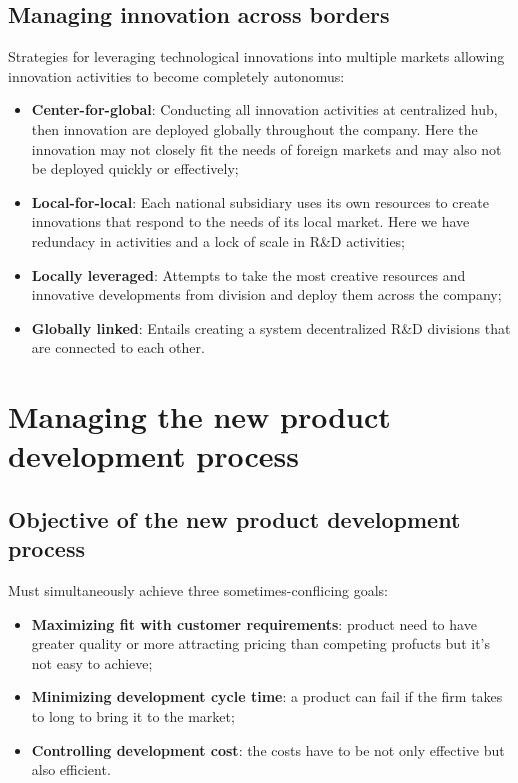\documentclass[12pt]{article}
\begin{document}
\subsection{Managing innovation across borders}
Strategies for leveraging technological innovations into multiple markets allowing innovation activities to become completely autonomus:
\begin{itemize}
    \item \textbf{Center-for-global}: Conducting all innovation activities at centralized hub, then innovation are deployed globally throughout the company. Here the innovation may not closely fit the needs of foreign markets and may also not be deployed quickly or effectively;
    \item \textbf{Local-for-local}: Each national subsidiary uses its own resources to create innovations that respond to the needs of its local market. Here we have redundacy in activities and a lock of scale in R\&D activities;
    \item \textbf{Locally leveraged}: Attempts to take the most creative resources and innovative developments from division and deploy them across the company;
    \item \textbf{Globally linked}: Entails creating a system decentralized R\&D divisions that are connected to each other.
\end{itemize}

\section{Managing the new product development process}
\subsection{Objective of the new product development process}
Must simultaneously achieve three sometimes-conflicing goals:
\begin{itemize}
    \item \textbf{Maximizing fit with customer requirements}: product need to have greater quality or more attracting pricing than competing profucts but it's not easy to achieve;
    \item \textbf{Minimizing development cycle time}: a product can fail if the firm takes to long to bring it to the market;
    \item \textbf{Controlling development cost}: the costs have to be not only effective but also efficient.
\end{itemize}
\end{document}
